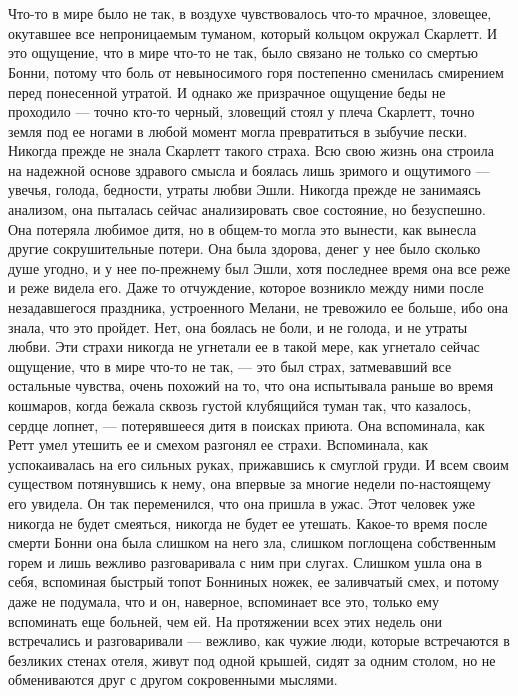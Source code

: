 \chapter{\ }

Что-то в мире было не так, в воздухе чувствовалось что-то мрачное, зловещее, окутавшее все непроницаемым туманом, который кольцом окружал Скарлетт. И это ощущение, что в мире что-то не так, было связано не только со смертью Бонни, потому что боль от невыносимого горя постепенно сменилась смирением перед понесенной утратой. И однако же призрачное ощущение беды не проходило — точно кто-то черный, зловещий стоял у плеча Скарлетт, точно земля под ее ногами в любой момент могла превратиться в зыбучие пески.
Никогда прежде не знала Скарлетт такого страха. Всю свою жизнь она строила на надежной основе здравого смысла и боялась лишь зримого и ощутимого — увечья, голода, бедности, утраты любви Эшли. Никогда прежде не занимаясь анализом, она пыталась сейчас анализировать свое состояние, но безуспешно. Она потеряла любимое дитя, но в общем-то могла это вынести, как вынесла другие сокрушительные потери. Она была здорова, денег у нее было сколько душе угодно, и у нее по-прежнему был Эшли, хотя последнее время она все реже и реже видела его. Даже то отчуждение, которое возникло между ними после незадавшегося праздника, устроенного Мелани, не тревожило ее больше, ибо она знала, что это пройдет. Нет, она боялась не боли, и не голода, и не утраты любви. Эти страхи никогда не угнетали ее в такой мере, как угнетало сейчас ощущение, что в мире что-то не так, — это был страх, затмевавший все остальные чувства, очень похожий на то, что она испытывала раньше во время кошмаров, когда бежала сквозь густой клубящийся туман так, что казалось, сердце лопнет, — потерявшееся дитя в поисках приюта.
Она вспоминала, как Ретт умел утешить ее и смехом разгонял ее страхи. Вспоминала, как успокаивалась на его сильных руках, прижавшись к смуглой груди. И всем своим существом потянувшись к нему, она впервые за многие недели по-настоящему его увидела. Он так переменился, что она пришла в ужас. Этот человек уже никогда не будет смеяться, никогда не будет ее утешать.
Какое-то время после смерти Бонни она была слишком на него зла, слишком поглощена собственным горем и лишь вежливо разговаривала с ним при слугах. Слишком ушла она в себя, вспоминая быстрый топот Бонниных ножек, ее заливчатый смех, и потому даже не подумала, что и он, наверное, вспоминает все это, только ему вспоминать еще больней, чем ей. На протяжении всех этих недель они встречались и разговаривали — вежливо, как чужие люди, которые встречаются в безликих стенах отеля, живут под одной крышей, сидят за одним столом, но не обмениваются друг с другом сокровенными мыслями.
